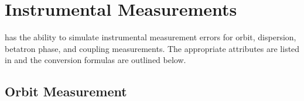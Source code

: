 \section{Instrumental Measurements}
\label{s:meas.calc}

\bmad has the ability to simulate instrumental measurement errors
for orbit, dispersion, betatron phase, and coupling measurements.
The appropriate attributes are listed in  and
the conversion formulas are outlined below.

\subsection{Orbit Measurement}

